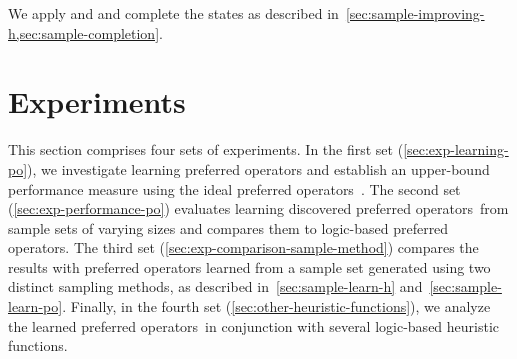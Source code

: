 \documentclass[ppgc,diss,english]{iiufrgs}
\begin{document}
We apply \sai and \sui and complete the states as described in~\cref{sec:sample-improving-h,sec:sample-completion}.


%
%
\chapter{Experiments}
\label{cha:exp-experiments}
This section comprises four sets of experiments. In the first set (\cref{sec:exp-learning-po}), we investigate learning preferred operators and establish an upper-bound performance measure using the ideal preferred operators~\postar. The second set (\cref{sec:exp-performance-po}) evaluates learning discovered preferred operators~\pog from sample sets of varying sizes and compares them to logic-based preferred operators. The third set (\cref{sec:exp-comparison-sample-method}) compares the results with preferred operators learned from a sample set generated using two distinct sampling methods, as described in~\cref{sec:sample-learn-h} and~\cref{sec:sample-learn-po}. Finally, in the fourth set (\cref{sec:other-heuristic-functions}), we analyze the learned preferred operators~\pog in conjunction with several logic-based heuristic functions.
\end{document}
